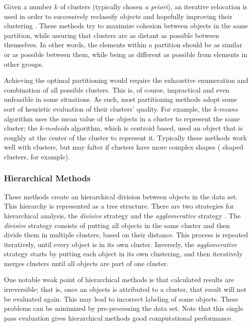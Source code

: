 Given a number $k$ of clusters (typically chosen \emph{a priori}), an iterative
relocation is used in order to successively reclassify objects and hopefully
improving their clustering \cite{DBLP:journals/corr/abs-1205-1117}. These
methods try to maximize cohesion between objects in the same partition, while
assuring that clusters are as distant as possible between themselves. In other
words, the elements within a partition should be as similar or  as
possible between them, while being as different as possible from elements in
other groups.

Achieving the optimal partitioning would require the exhaustive enumeration and
combination of all possible clusters. This is, of course, impractical and even
unfeasible in some situations. As such, most partitioning methods adopt some
sort of heuristic evaluation of their clusters' quality. For example, the
\emph{k-means} algorithm uses the mean value of the objects in a cluster to
represent the same cluster; the \emph{k-medoids} algorithm, which is
centroid based, used an object that is roughly at the center of the cluster to
represent it. Typically these methods work well with  clusters,
but may falter if clusters have more complex shapes ( shaped
clusters, for example).

\subsubsection*{Hierarchical Methods}

These methods create an hierarchical division between objects in the data set.
This hierarchy is represented as a tree structure. There are two strategies for
hierarchical analysis, the \emph{divisive} strategy and the \emph{agglomerative}
strategy \cite{han2006data}. The \emph{divisive} strategy consists of putting
all objects in the same cluster and then divide them in multiple clusters, based
on their distance. This process is repeated iteratively, until every object is
in its own cluster. Inversely, the \emph{agglomerative} strategy starts by
putting each object in its own clustering, and then iteratively merges clusters
until all objects are part of one cluster.

One notable weak point of hierarchical methods is that calculated results are
irreversible; that is, once an objects is attributed to a cluster, that result
will not be evaluated again. This may lead to incorrect labeling of some
objects. These problems can be minimized by pre-processing the data set. Note
that this single pass evaluation gives hierarchical methods good computational
performance.

